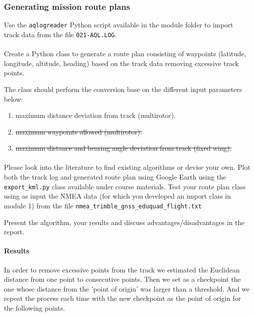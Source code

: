 \documentclass[paper=letter, fontsize=10pt]{article}
\begin{document}
\subsubsection{Generating mission route plans}
Use the \texttt{aqlogreader} Python script available in the module folder to import track data from the file \texttt{021-AQL.LOG}. 
\paragraph{}
Create a Python class to generate a route plan consisting of waypoints (latitude, longitude, altitude, heading) based on the track data removing excessive track points.

The class should perform the conversion base on the different input parameters below: 
\begin{enumerate}
\item maximum distance deviation from track (multirotor).
\item \st{maximum waypoints allowed (multirotor).}
\item \st{maximum distance and bearing angle deviation from track (fixed wing).}
\end{enumerate}

\paragraph{}
Please look into the literature to find existing algorithms or devise your own.
Plot both the track log and generated route plan using Google Earth using the \texttt{export\_kml.py} class available under course materials.
Test your route plan class using as input the NMEA data (for which you developed an import class in module 1) from the file \texttt{nmea\_trimble\_gnss\_eduquad\_flight.txt}

Present the algorithm, your results and discuss advantages/disadvantages in the report.
\paragraph{Results}


In order to remove excessive points from the track we estimated the Euclidean distance from one point to consecutive points. Then we set as a checkpoint the one whose distance from the 'point of origin' was larger than a threshold. And we repeat the process each time with the new checkpoint as the point of origin for the following points.
\end{document}
